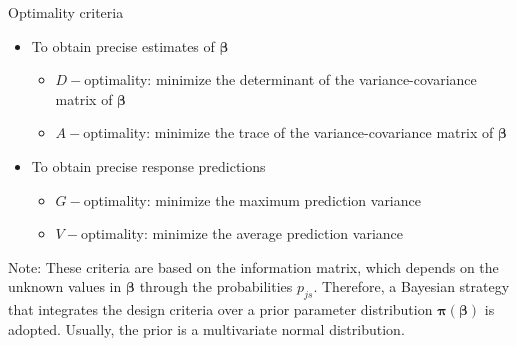 \documentclass[11pt,t]{beamer}
\begin{document}
\begin{frame}

\centering
\end{frame}

\appendix
\begin{frame}[noframenumbering]{Optimality criteria}
	\begin{itemize}
		\item To obtain precise estimates of $\pmb{\beta}$
		\begin{itemize}
			\item \textcolor{kul-blue}{$\mathit{D}-$optimality: minimize the determinant of the variance-covariance matrix of $\pmb{\beta}$}
			\item $\mathit{A}-$optimality: minimize the trace of the variance-covariance matrix of $\pmb{\beta}$
		\end{itemize}
		\item To obtain precise response predictions
		\begin{itemize}
			\item $\mathit{G}-$optimality: minimize the maximum prediction variance
			\item $\mathit{V}-$optimality: minimize the average prediction variance
		\end{itemize}					
	\end{itemize}
	\begin{alertblock}{Note:}
		These criteria are based on the information matrix, which depends on the unknown values in $\pmb{\beta}$ through the probabilities $p_{js}$. Therefore, a Bayesian strategy that integrates the design criteria over a prior parameter distribution $\pmb{\pi(\beta)}$ is adopted. Usually, the prior is a multivariate normal distribution.
	\end{alertblock}
\end{frame}
\end{document}
